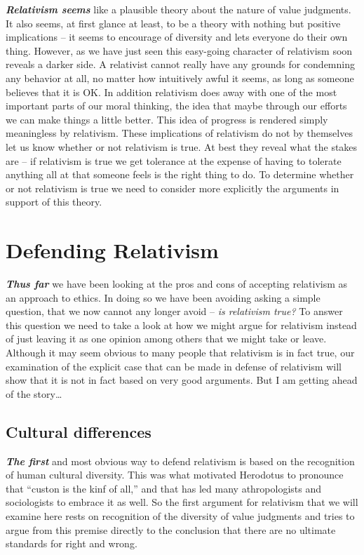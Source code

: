 \documentclass[]{book}
\begin{document}
\textbf{\emph{Relativism seems}} like a plausible theory about the nature of value judgments. It also seems, at first glance at least, to be a theory with nothing but positive implications -- it seems to encourage of diversity and lets everyone do their own thing. However, as we have just seen this easy-going character of relativism soon reveals a darker side. A relativist cannot really have any grounds for condemning any behavior at all, no matter how intuitively awful it seems, as long as someone believes that it is OK. In addition relativism does away with one of the most important parts of our moral thinking, the idea that maybe through our efforts we can make things a little better. This idea of progress is rendered simply meaningless by relativism. These implications of relativism do not by themselves let us know whether or not relativism is true. At best they reveal what the stakes are -- if relativism is true we get tolerance at the expense of having to tolerate anything all at that someone feels is the right thing to do. To determine whether or not relativism is true we need to consider more explicitly the arguments in support of this theory.

\hypertarget{defending-relativism}{%
\section{Defending Relativism}\label{defending-relativism}}

\textbf{\emph{Thus far}} we have been looking at the pros and cons of accepting relativism as an approach to ethics. In doing so we have been avoiding asking a simple question, that we now cannot any longer avoid -- \emph{is relativism true?} To answer this question we need to take a look at how we might argue for relativism instead of just leaving it as one opinion among others that we might take or leave. Although it may seem obvious to many people that relativism is in fact true, our examination of the explicit case that can be made in defense of relativism will show that it is not in fact based on very good arguments. But I am getting ahead of the story\ldots{}

\hypertarget{cultural-differences}{%
\subsection*{Cultural differences}\label{cultural-differences}}


\textbf{\emph{The first}} and most obvious way to defend relativism is based on the recognition of human cultural diversity. This was what motivated Herodotus to pronounce that ``custon is the kinf of all,'' and that has led many athropologists and sociologists to embrace it as well. So the first argument for relativism that we will examine here rests on recognition of the diversity of value judgments and tries to argue from this premise directly to the conclusion that there are no ultimate standards for right and wrong.
\end{document}
